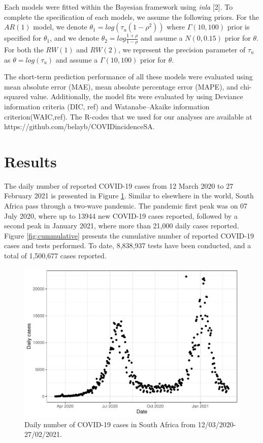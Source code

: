 \documentclass[10pt,letterpaper]{article}
\begin{document}
Each models were fitted within the Bayesian framework using
\emph{inla} {[}2{]}. To complete the specification of each models, we
assume the following priors. For the \(AR(1)\) model, we denote
\(\theta_1=log(\tau_u(1-\rho^2))\) where \(\Gamma(10,100)\) prior is
specified for \(\theta_1\), and we denote
\(\theta_2=log\frac{1+\rho}{1-\rho}\) and assume a \(N(0, 0.15)\) prior
for \(\theta\). For both the \(RW(1)\) and \(RW(2)\), we represent the precision parameter of
\(\tau_u\) as \(\theta=log(\tau_u)\) and assume a
\(\Gamma (10,100)\) prior for \(\theta\).

The short-term prediction performance of all these models were evaluated using mean absolute error (MAE), mean absolute percentage error (MAPE), and chi-squared value. Additionally, the model fits were evaluated by using Deviance information criteria (DIC, ref) and Watanabe–Akaike information criterion(WAIC,ref). The R-codes that we used for our analyses are available at
https://github.com/belayb/COVIDincidenceSA.



\hypertarget{results}{%
\section{Results}\label{results}}

The daily number of reported COVID-19 cases from 12
March 2020 to 27 February 2021 is presented in Figure \ref{fig:daily-cases}. Similar to elsewhere in the world, South
Africa pass through a two-wave pandemic. The pandemic first peak was
on 07 July 2020, where up to 13944 new COVID-19 cases reported, followed
by a second peak in January 2021, where more than 21,000 daily cases
reported. Figure \ref{fig:cummulative} presents the cumulative number of reported
COVID-19 cases and tests performed. To date, 8,838,937 tests have been
conducted, and a total of 1,500,677 cases reported.

\begin{figure}[H]
\includegraphics[width=0.99\linewidth]{COVIDincidenceSA_files/figure-latex/daily-cases-1} \caption{Daily number of COVID-19 cases in South Africa from 12/03/2020-27/02/2021.}\label{fig:daily-cases}
\end{figure}
\end{document}
